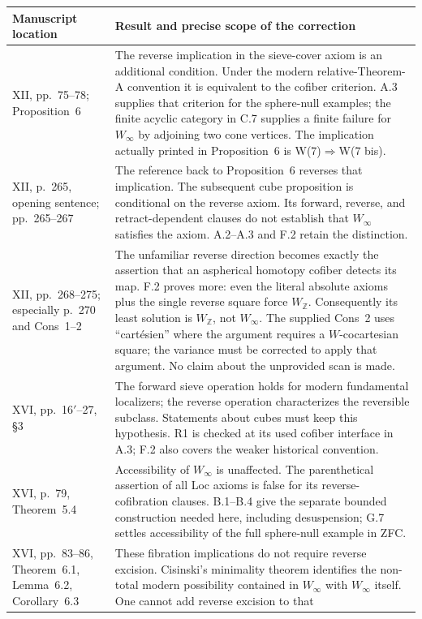 \small
\begin{longtable}{@{}p{}p{}@{}}
\toprule
Manuscript location & Result and precise scope of the correction \\
\midrule
\endhead
XII, pp.~75--78; Proposition~6 &
The reverse implication in the sieve-cover axiom is an additional condition.
Under the modern relative-Theorem-A convention it is equivalent to the cofiber
criterion. A.3 supplies that criterion for the sphere-null examples; the
finite acyclic category in C.7 supplies a finite failure for $W_\infty$ by
adjoining two cone vertices. The implication actually printed in
Proposition~6 is W(7)$\Rightarrow$W(7 bis). \\
XII, p.~265, opening sentence; pp.~265--267 &
The reference back to Proposition~6 reverses that implication. The subsequent
cube proposition is conditional on the reverse axiom. Its forward, reverse,
and retract-dependent clauses do not establish that $W_\infty$ satisfies the
axiom. A.2--A.3 and F.2 retain the distinction. \\
XII, pp.~268--275; especially p.~270 and Cons~1--2 &
The unfamiliar reverse direction becomes exactly the assertion that an
aspherical homotopy cofiber detects its map. F.2 proves more: even the literal
absolute axioms plus the single reverse square force $W_{\mathbb Z}$.
Consequently its least solution is $W_{\mathbb Z}$, not $W_\infty$.
The supplied Cons~2 uses ``cart\'esien'' where the argument requires a
$W$-cocartesian square; the variance must be corrected to apply that argument.
No claim about the unprovided scan is made. \\
XVI, pp.~16$'$--27, \S3 &
The forward sieve operation holds for modern fundamental localizers;
the reverse operation characterizes the reversible subclass. Statements
about cubes must keep this hypothesis. R1 is checked at its used cofiber
interface in A.3; F.2 also covers the weaker historical convention. \\
XVI, p.~79, Theorem~5.4 &
Accessibility of $W_\infty$ is unaffected. The parenthetical assertion of all
Loc axioms is false for its reverse-cofibration clauses. B.1--B.4 give the
separate bounded construction needed here, including desuspension; G.7
settles accessibility of the full sphere-null example in ZFC. \\
XVI, pp.~83--86, Theorem~6.1, Lemma~6.2, Corollary~6.3 &
These fibration implications do not require reverse excision. Cisinski's
minimality theorem identifies the non-total modern possibility contained in
$W_\infty$ with $W_\infty$ itself. One cannot add reverse excision to that

\end{longtable}
